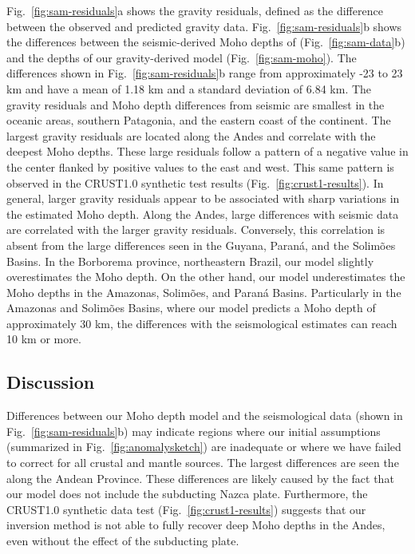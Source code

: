 \documentclass[extra,mreferee]{gji}
\begin{document}
Fig.~\ref{fig:sam-residuals}a shows the gravity residuals,
defined as the difference between the observed and predicted gravity data.
Fig.~\ref{fig:sam-residuals}b shows the differences between
the seismic-derived Moho depths of \citet{assumpcao2013a}
(Fig.~\ref{fig:sam-data}b) and the depths of our gravity-derived model
(Fig.~\ref{fig:sam-moho}).
The differences shown in Fig.~\ref{fig:sam-residuals}b range from approximately
-23 to 23 km and have a mean of 1.18 km and a standard deviation of 6.84 km.
The gravity residuals and Moho depth differences from seismic are smallest in
the oceanic areas, southern Patagonia, and the eastern coast of the continent.
The largest gravity residuals are located along the Andes and correlate with
the deepest Moho depths.
These large residuals follow a pattern of a negative value in the center
flanked by positive values to the east and west.
This same pattern is observed in the CRUST1.0 synthetic test results
(Fig.~\ref{fig:crust1-results}).
In general, larger gravity residuals appear to be associated with sharp
variations in the estimated Moho depth.
Along the Andes, large differences with seismic data are correlated with the
larger gravity residuals.
Conversely, this correlation is absent from the large differences seen in the
Guyana, Paraná, and the Solimões Basins.
In the Borborema province, northeastern Brazil,
our model slightly overestimates the Moho depth.
On the other hand, our model underestimates the Moho depths in the Amazonas,
Solimões, and Paraná Basins.
Particularly in the Amazonas and Solimões Basins, where our model predicts a
Moho depth of approximately 30 km, the differences with the seismological
estimates can reach 10 km or more.

\subsection{Discussion}


Differences between our Moho depth model and the seismological data
(shown in Fig.~\ref{fig:sam-residuals}b)
may indicate regions where our initial assumptions
(summarized in Fig.~\ref{fig:anomalysketch})
are inadequate or where we have
failed to correct for all crustal and mantle sources.
The largest differences are seen the along the Andean Province.
These differences are likely caused by the fact that our model does not include
the subducting Nazca plate.
Furthermore, the CRUST1.0 synthetic data test (Fig.~\ref{fig:crust1-results})
suggests that our inversion method is not able to fully recover deep Moho
depths in the Andes,
even without the effect of the subducting plate.
\end{document}
